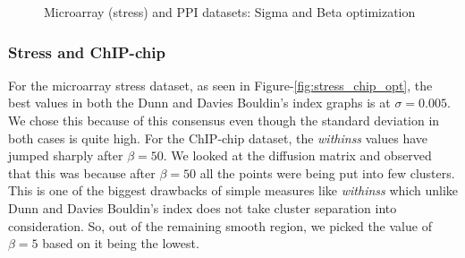 \begin{figure}[htp]
\begin{center}
  \end{center}
  \caption{Microarray (stress) and PPI datasets: Sigma and Beta optimization}
  \label{fig:stress_ppi_opt}
\end{figure}

\subsubsection{Stress and ChIP-chip}
For the microarray stress dataset, as seen in Figure-\ref{fig:stress_chip_opt}, the best values in both the Dunn and Davies Bouldin's index graphs is at $\sigma=0.005$. We chose this because of this consensus even though the standard deviation in both cases is quite high. For the ChIP-chip dataset, the \textit{withinss} values have jumped sharply after $\beta=50$. We looked at the diffusion matrix and observed that this was because after $\beta=50$ all the points were being put into few clusters. This is one of the biggest drawbacks of simple measures like \textit{withinss} which unlike Dunn and Davies Bouldin's index does not take cluster separation into consideration. So, out of the remaining smooth region, we picked the value of $\beta=5$ based on it being the lowest.
